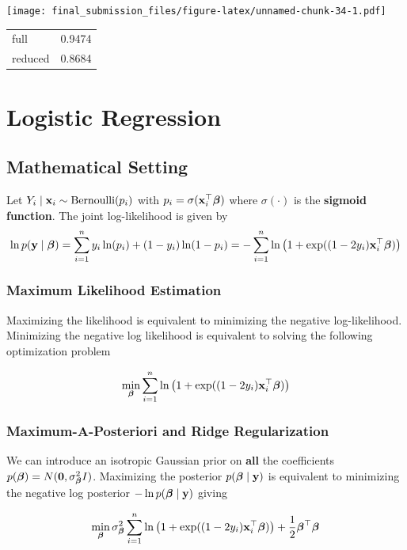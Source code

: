 \documentclass[]{article}
\begin{document}
\texttt{[image: final\_submission\_files/figure-latex/unnamed-chunk-34-1.pdf]}

\begin{longtable}[]{@{}lr@{}}
\toprule
full & 0.9474\tabularnewline
reduced & 0.8684\tabularnewline
\bottomrule
\end{longtable}

\newpage

\section{Logistic Regression}\label{logistic-regression}

\subsection{Mathematical Setting}\label{mathematical-setting-1}

Let \(Y_i\mid \boldsymbol{\mathbf{x}}_i \sim \text{Bernoulli}(p_i)\) with
\(p_i = \sigma(\boldsymbol{\mathbf{x}}_i^\top \boldsymbol{\mathbf{\beta}})\) where \(\sigma(\cdot)\) is the
\textbf{sigmoid function}. The joint log-likelihood is given by \[
\ln p(\boldsymbol{\mathbf{y}}\mid \boldsymbol{\mathbf{\beta}}) = \sum_{i=1}^n y_i \ln(p_i) + (1 - y_i)\ln(1 - p_i)=-\sum_{i=1}^n\ln\left(1 + \exp((1 - 2y_i)\boldsymbol{\mathbf{x}}_i^\top\boldsymbol{\mathbf{\beta}})\right)
\]

\subsubsection{Maximum Likelihood
Estimation}\label{maximum-likelihood-estimation}

Maximizing the likelihood is equivalent to minimizing the negative
log-likelihood. Minimizing the negative log likelihood is equivalent to
solving the following optimization problem

\[
\min_{\boldsymbol{\mathbf{\beta}}}\sum_{i=1}^n\ln\left(1 + \exp((1 - 2y_i)\boldsymbol{\mathbf{x}}_i^\top\boldsymbol{\mathbf{\beta}})\right)
\]

\subsubsection{Maximum-A-Posteriori and Ridge
Regularization}\label{maximum-a-posteriori-and-ridge-regularization}

We can introduce an isotropic Gaussian prior on \textbf{all} the
coefficients \(p(\boldsymbol{\mathbf{\beta}}) = N(\boldsymbol{\mathbf{0}}, \sigma_{\boldsymbol{\mathbf{\beta}}}^2 I)\). Maximizing
the posterior \(p(\boldsymbol{\mathbf{\beta}} \mid \boldsymbol{\mathbf{y}})\) is equivalent to minimizing the
negative log posterior \(-\ln p(\boldsymbol{\mathbf{\beta}}\mid \boldsymbol{\mathbf{y}})\) giving

\[
\min_{\boldsymbol{\mathbf{\beta}}} \sigma^2_{\boldsymbol{\mathbf{\beta}}}\sum_{i=1}^n\ln\left(1 + \exp((1 - 2y_i)\boldsymbol{\mathbf{x}}_i^\top\boldsymbol{\mathbf{\beta}})\right) + \frac{1}{2}\boldsymbol{\mathbf{\beta}}^\top\boldsymbol{\mathbf{\beta}}
\]
\end{document}

